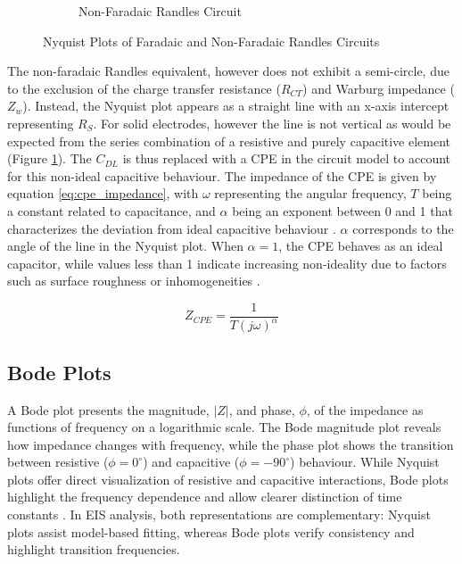 \begin{figure}[H]
\begin{subfigure}{0.45\textwidth}
        \caption[Non-Faradaic Randles Circuit]{Non-Faradaic Randles Circuit \cite{xieReviewAdvancementsNanoscale2020a}}
        \label{fig:RandlesNonFaradaicNyquist}    
    \end{subfigure}
    \caption{Nyquist Plots of Faradaic and Non-Faradaic Randles Circuits}
    \label{fig:randles_nyquist}
\end{figure}

The non-faradaic Randles equivalent, however does not exhibit a semi-circle, due to the exclusion of the charge transfer resistance ($R_{CT}$) and Warburg impedance ($Z_w$). Instead, the Nyquist plot appears as a straight line with an x-axis intercept representing $R_S$. For solid electrodes, however the line is not vertical as would be expected from the series combination of a resistive and purely capacitive element \cite{xieReviewAdvancementsNanoscale2020a} (Figure \ref{fig:RandlesNonFaradaicNyquist}). The $C_{DL}$ is thus replaced with a \ac{CPE} in the circuit model to account for this non-ideal capacitive behaviour. The impedance of the \ac{CPE} is given by equation \ref{eq:cpe_impedance}, with $\omega$ representing the angular frequency, $T$ being a constant related to capacitance, and $\alpha$ being an exponent between 0 and 1 that characterizes the deviation from ideal capacitive behaviour \cite{xieReviewAdvancementsNanoscale2020a}. $\alpha$ corresponds to the angle of the line in the Nyquist plot. When $\alpha = 1$, the \ac{CPE} behaves as an ideal capacitor, while values less than 1 indicate increasing non-ideality due to factors such as surface roughness or inhomogeneities \cite{xieReviewAdvancementsNanoscale2020a}.

\begin{equation}
    Z_{CPE} = \frac{1}{T(j\omega)^{\alpha}}
    \label{eq:cpe_impedance}
\end{equation}

\subsection{Bode Plots}

A Bode plot presents the magnitude, $|Z|$, and phase, $\phi$, of the impedance as functions of frequency on a logarithmic scale. The Bode magnitude plot reveals how impedance changes with frequency, while the phase plot shows the transition between resistive ($\phi = 0^\circ$) and capacitive ($\phi = -90^\circ$) behaviour. While Nyquist plots offer direct visualization of resistive and capacitive interactions, Bode plots highlight the frequency dependence and allow clearer distinction of time constants \cite{BodeNyquistPlot}. In EIS analysis, both representations are complementary: Nyquist plots assist model-based fitting, whereas Bode plots verify consistency and highlight transition frequencies.

